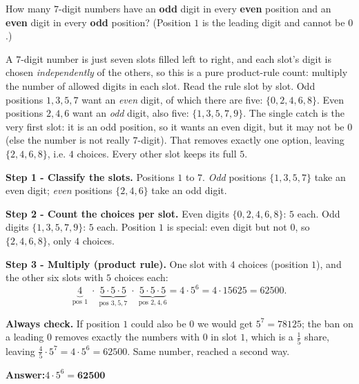 \documentclass[11pt,a4paper]{article}
\newcommand{\answer}[1]{\begin{answerbox}\centering\textbf{Answer:}\quad #1\end{answerbox}}
\begin{document}
\begin{problembox}[1.10]
How many $7$-digit numbers have an \textbf{odd} digit in every \textbf{even} position and an
\textbf{even} digit in every \textbf{odd} position? (Position $1$ is the leading digit and cannot
be $0$.)
\end{problembox}

\begin{ideabox}
A $7$-digit number is just seven slots filled left to right, and each slot's digit is chosen
\emph{independently} of the others, so this is a pure product-rule count: multiply the number of
allowed digits in each slot. Read the rule slot by slot. Odd positions $1,3,5,7$ want an
\emph{even} digit, of which there are five: $\{0,2,4,6,8\}$. Even positions $2,4,6$ want an
\emph{odd} digit, also five: $\{1,3,5,7,9\}$. The single catch is the very first slot: it is an
odd position, so it wants an even digit, but it may not be $0$ (else the number is not really
$7$-digit). That removes exactly one option, leaving $\{2,4,6,8\}$, i.e. $4$ choices. Every other
slot keeps its full $5$.
\end{ideabox}

\textbf{Step 1 - Classify the slots.}
Positions $1$ to $7$. \emph{Odd} positions $\{1,3,5,7\}$ take an even digit; \emph{even} positions
$\{2,4,6\}$ take an odd digit.

\textbf{Step 2 - Count the choices per slot.}
Even digits $\{0,2,4,6,8\}$: $5$ each. Odd digits $\{1,3,5,7,9\}$: $5$ each. Position $1$ is
special: even digit but not $0$, so $\{2,4,6,8\}$, only $4$ choices.

\textbf{Step 3 - Multiply (product rule).}
One slot with $4$ choices (position $1$), and the other six slots with $5$ choices each:
\[
\underbrace{4}_{\text{pos }1}\;\cdot\;\underbrace{5\cdot5\cdot5}_{\text{pos }3,5,7}\;\cdot\;\underbrace{5\cdot5\cdot5}_{\text{pos }2,4,6}
= 4\cdot 5^{6} = 4\cdot 15625 = 62500 .
\]

\textbf{Always check.} If position $1$ could also be $0$ we would get $5^7=78125$; the
ban on a leading $0$ removes exactly the numbers with $0$ in slot $1$, which is a $\tfrac15$ share,
leaving $\tfrac45\cdot 5^7 = 4\cdot 5^6 = 62500$. Same number, reached a second way. \checkmark

\answer{$4\cdot 5^{6} = \mathbf{62500}$}
\end{document}
